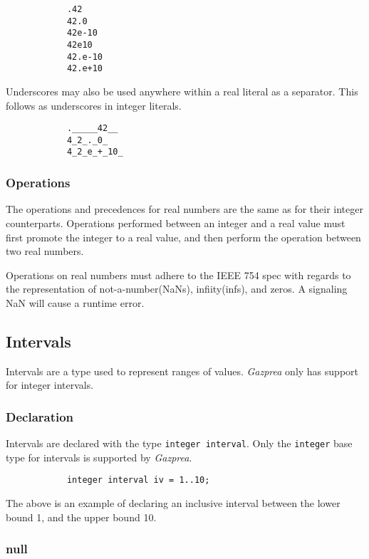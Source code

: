 \documentclass[../../gazprea.tex]{subfiles}
\begin{document}
		\begin{lstlisting}
			.42
			42.0
			42e-10
			42e10
			42.e-10
			42.e+10
		\end{lstlisting}

		Underscores may also be used anywhere within a real literal as a separator.  This follows as underscores in
		integer literals.

		\begin{lstlisting}
			._____42__
			4_2_._0_
			4_2_e_+_10_
		\end{lstlisting}

	\subsubsection{Operations}

		The operations and precedences for real numbers are the same as for their integer counterparts. Operations
		performed between an integer and a real value must first promote the integer to a real value, and then perform
		the operation between two real numbers.

		Operations on real numbers must adhere to the \textsf{IEEE 754} spec with regards to the representation of
		not-a-number(NaNs), infiity(infs), and zeros. A signaling NaN will cause a runtime error.


	\subsection{Intervals}\label{sec:interval}
		Intervals are a type used to represent ranges of values.
 		\textit{Gazprea} only has support for integer intervals.

	\subsubsection{Declaration}

		Intervals are declared with the type \texttt{integer interval}. Only the \texttt{integer} base type for
		intervals is supported by \textit{Gazprea}.

		\begin{lstlisting}
			integer interval iv = 1..10;
		\end{lstlisting}

		The above is an example of declaring an inclusive interval between the lower bound 1, and the upper bound 10.

	\subsubsection{null}
\end{document}
